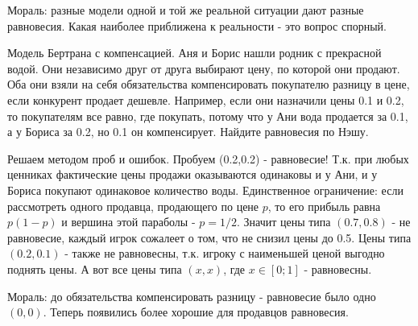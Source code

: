 \documentclass[pdftex,12pt,a4paper]{article}
\begin{document}
Мораль: разные модели одной и той же реальной ситуации дают разные равновесия. Какая наиболее приближена к реальности - это вопрос спорный.


\vspace{10pt}
Модель Бертрана с компенсацией. Аня и Борис нашли родник с прекрасной водой. Они независимо друг от друга выбирают цену, по которой они продают. Оба они взяли на себя обязательства компенсировать покупателю разницу в цене, если конкурент продает дешевле. Например, если они назначили цены 0.1 и 0.2, то покупателям все равно, где покупать, потому что у Ани вода продается за 0.1, а у Бориса за 0.2, но 0.1 он компенсирует. Найдите равновесия по Нэшу.


\vspace{10pt}
Решаем методом проб и ошибок. Пробуем (0.2,0.2) - равновесие! Т.к. при любых ценниках фактические цены продажи оказываются одинаковы и у Ани, и у Бориса покупают одинаковое количество воды. Единственное ограничение: если рассмотреть одного продавца, продающего по цене $p$, то его прибыль равна $p(1-p)$ и вершина этой параболы - $p=1/2$. Значит цены типа $(0.7,0.8)$ - не равновесие, каждый игрок сожалеет о том, что не снизил цены до 0.5. Цены типа $(0.2,0.1)$ - также не равновесны, т.к. игроку с наименьшей ценой выгодно поднять цены. А вот все цены типа $(x,x)$, где $x\in[0;1]$ - равновесны.

Мораль: до обязательства компенсировать разницу - равновесие было одно $(0,0)$. Теперь появились более хорошие для продавцов равновесия.




\printindex %
\end{document}
